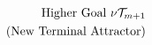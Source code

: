 \documentclass[preview]{standalone}
\begin{document}
\begin{align*}
\special{dvisvgm:raw <g id='unique000'>}\text{Higher Goal }\nu\mathcal{T}_{m+1}\\\text{(New Terminal Attractor)}\special{dvisvgm:raw </g>}
\end{align*}
\end{document}
